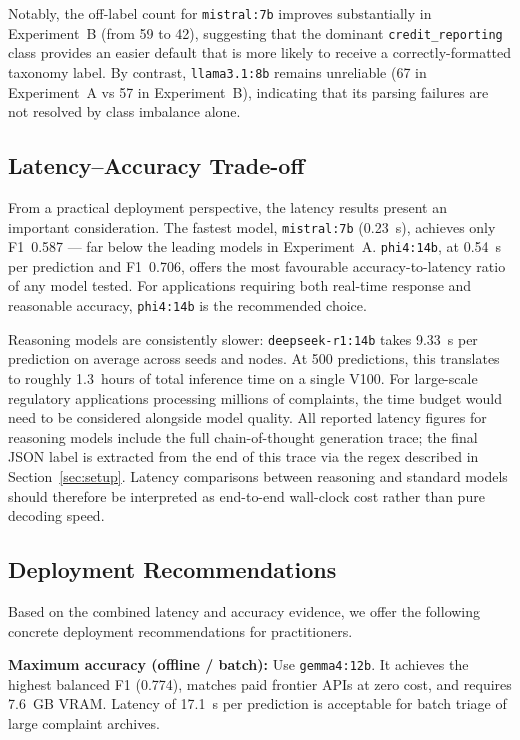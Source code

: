 \documentclass[journal]{IEEEtran}
\begin{document}
Notably, the off-label count for \texttt{mistral:7b} improves
substantially in Experiment~B (from 59 to 42), suggesting that the
dominant \texttt{credit\_reporting} class provides an easier default
that is more likely to receive a correctly-formatted taxonomy label.
By contrast, \texttt{llama3.1:8b} remains unreliable
(67 in Experiment~A vs 57 in Experiment~B), indicating that its
parsing failures are not resolved by class imbalance alone.

\subsection{Latency–Accuracy Trade-off}

From a practical deployment perspective, the latency results present
an important consideration. The fastest model, \texttt{mistral:7b}
(0.23~s), achieves only F1~0.587 — far below the leading models in
Experiment~A.
\texttt{phi4:14b}, at 0.54~s per prediction and F1~0.706, offers
the most favourable accuracy-to-latency ratio of any model tested.
For applications requiring both real-time response and reasonable
accuracy, \texttt{phi4:14b} is the recommended choice.

Reasoning models are consistently slower: \texttt{deepseek-r1:14b}
takes 9.33~s per prediction on average across seeds and nodes.
At 500 predictions, this translates to roughly 1.3~hours of total
inference time on a single V100. For
large-scale regulatory applications processing millions of complaints,
the time budget would need to be considered alongside model quality.
All reported latency figures for reasoning models include the full
chain-of-thought generation trace; the final JSON label is extracted
from the end of this trace via the regex described in
Section~\ref{sec:setup}. Latency comparisons between reasoning and
standard models should therefore be interpreted as end-to-end
wall-clock cost rather than pure decoding speed.

\subsection{Deployment Recommendations}

Based on the combined latency and accuracy evidence, we offer the
following concrete deployment recommendations for practitioners.

\textbf{Maximum accuracy (offline / batch):}
Use \texttt{gemma4:12b}. It achieves the highest balanced F1 (0.774),
matches paid frontier APIs at zero cost, and requires 7.6~GB VRAM.
Latency of 17.1~s per prediction is acceptable for batch triage of
large complaint archives.
\end{document}
